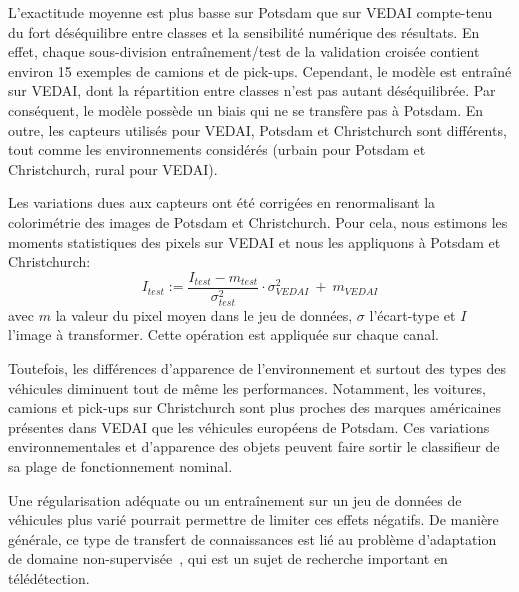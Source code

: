 L'exactitude moyenne est plus basse sur Potsdam que sur \gls{VEDAI} compte-tenu du fort déséquilibre entre classes et la sensibilité numérique des résultats. En effet, chaque sous-division entraînement/test de la validation croisée contient environ 15 exemples de camions et de pick-ups. Cependant, le modèle est entraîné sur \gls{VEDAI}, dont la répartition entre classes n'est pas autant déséquilibrée. Par conséquent, le modèle possède un biais qui ne se transfère pas à Potsdam. En outre, les capteurs utilisés pour \gls{VEDAI}, Potsdam et Christchurch sont différents, tout comme les environnements considérés (urbain pour Potsdam et Christchurch, rural pour \gls{VEDAI}).

Les variations dues aux capteurs ont été corrigées en renormalisant la colorimétrie des images de Potsdam et Christchurch. Pour cela, nous estimons les moments statistiques des pixels sur \gls{VEDAI} et nous les appliquons à Potsdam et Christchurch:
\begin{equation}
I_\mathit{test} := \frac{I_\mathit{test} - m_\mathit{test}}{\sigma^2_\mathit{test}} \cdot \sigma^2_\mathit{VEDAI}~+~m_\mathit{VEDAI}
\end{equation}
avec $m$ la valeur du pixel moyen dans le jeu de données, $\sigma$ l'écart-type et $I$ l'image à transformer. Cette opération est appliquée sur chaque canal.

Toutefois, les différences d'apparence de l'environnement et surtout des types des véhicules diminuent tout de même les performances. Notamment, les voitures, camions et pick-ups sur Christchurch sont plus proches des marques américaines présentes dans \gls{VEDAI} que les véhicules européens de Potsdam. Ces variations environnementales et d'apparence des objets peuvent faire sortir le classifieur de sa plage de fonctionnement nominal.

Une régularisation adéquate ou un entraînement sur un jeu de données de véhicules plus varié pourrait permettre de limiter ces effets négatifs. De manière générale, ce type de transfert de connaissances est lié au problème d'adaptation de domaine non-supervisée~\cite{tuia_domain_2016,courty_optimal_2016}, qui est un sujet de recherche important en télédétection.

